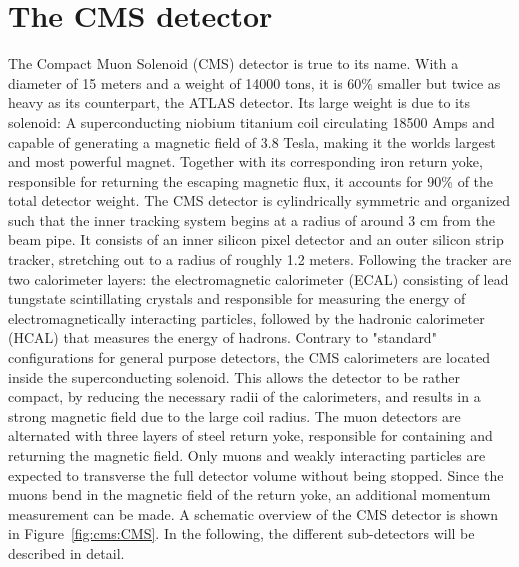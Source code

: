 \chapter{The CMS detector}
The Compact Muon Solenoid (CMS) detector is true to its name. With a diameter of 15 meters and a weight of 14000 tons, it is 60\% smaller but twice as heavy as its counterpart, the ATLAS detector.
Its large weight is due to its solenoid: A superconducting niobium titanium coil circulating 18500 Amps and capable of generating a magnetic field of 3.8 Tesla, making it the worlds largest and most powerful magnet. Together with its corresponding iron return yoke, responsible for returning the escaping magnetic flux, it accounts for 90\% of the total detector weight.
The CMS detector is cylindrically symmetric and organized such that the inner tracking system begins at a radius of around 3 cm from the beam pipe. It consists of an inner silicon pixel detector and an outer silicon strip tracker, stretching out to a radius of roughly 1.2 meters. Following the tracker are two calorimeter layers: the electromagnetic calorimeter (ECAL) consisting of lead tungstate scintillating crystals and responsible for measuring the energy of electromagnetically interacting particles, followed by the hadronic calorimeter (HCAL) that measures the energy of hadrons.
Contrary to "standard" configurations for general purpose detectors, the CMS calorimeters are located inside the superconducting solenoid. This allows the detector to be rather compact, by reducing the necessary radii of the calorimeters, and results in a strong magnetic field due to the large coil radius. The muon detectors are alternated with three layers of steel return yoke, responsible for containing and returning the magnetic field. Only muons and weakly interacting particles are expected to transverse the full detector volume without being stopped. Since the muons bend in the magnetic field of the return yoke, an additional momentum measurement can be made. A schematic overview of the CMS detector is shown in Figure~\ref{fig:cms:CMS}. In the following, the different sub-detectors will be described in detail.
